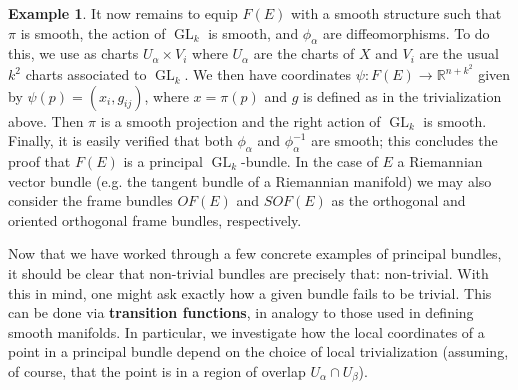\documentclass{book}
\newcommand{\R}{\mathbb{R}}
\DeclareMathOperator{\GL}{GL}
\theoremstyle{plain}
\theoremstyle{definition}
\newtheorem{exmp}{Example}
\theoremstyle{remark}
\begin{document}
\begin{exmp}
    It now remains to equip $F(E)$ with a smooth structure such that $\pi$ is smooth, the action of $\GL_k$ is smooth, and $\phi_\alpha$ are
    diffeomorphisms. To do this, we use as charts $U_\alpha\times V_i$ where $U_\alpha$ are the charts of $X$ and $V_i$ are the usual $k^2$
    charts associated to $\GL_k$. We then have coordinates $\psi:F(E)\to\R^{n+k^2}$ given by $\psi(p)=(x_i,g_{ij})$, where $x=\pi(p)$ and $g$
    is defined as in the trivialization above. Then $\pi$ is a smooth projection and the right action of $\GL_k$ is smooth. Finally, it is easily
    verified that both $\phi_\alpha$ and $\phi_\alpha^{-1}$ are smooth; this concludes the proof that $F(E)$ is a principal $\GL_k$-bundle. In the
    case of $E$ a Riemannian vector bundle (e.g. the tangent bundle of a Riemannian manifold) we may also consider the frame bundles
    $OF(E)$ and $SOF(E)$ as the orthogonal and oriented orthogonal frame bundles, respectively.
    

\end{exmp}

Now that we have worked through a few concrete examples of principal bundles, it should be clear that non-trivial bundles are precisely that: non-trivial.
With this in mind, one might ask exactly how a
given bundle fails to be trivial. This can be done via \textbf{transition functions}, in analogy to those used in defining smooth manifolds.
In particular, we investigate how the local coordinates of a point in a principal bundle depend on the choice of local trivialization (assuming, of
course, that the point is in a region of overlap $U_\alpha\cap U_\beta$).
\end{document}
